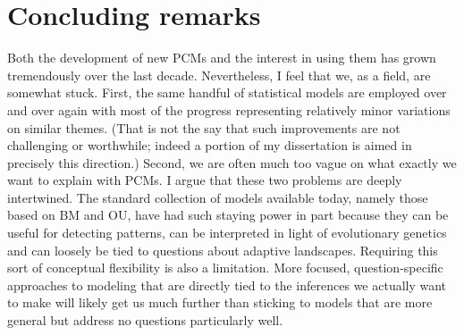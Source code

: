 \section{Concluding remarks}

Both the development of new PCMs and the interest in using them has grown tremendously over the last decade.  Nevertheless, I feel that we, as a field, are somewhat stuck. First, the same handful of statistical models are employed over and over again with most of the progress representing relatively minor variations on similar themes. (That is not the say that such improvements are not challenging or worthwhile; indeed a portion of my dissertation is aimed in precisely this direction.) Second, we are often much too vague on what exactly we want to explain with PCMs. I argue that these two problems are deeply intertwined. The standard collection of models available today, namely those based on BM and OU, have had such staying power in part because they can be useful for detecting patterns, can be interpreted in light of evolutionary genetics and can loosely be tied to questions about adaptive landscapes. Requiring this sort of conceptual flexibility is also a limitation. More focused, question-specific approaches to modeling that are directly tied to the inferences we actually want to make will likely get us much further than sticking to models that are more general but address no questions particularly well.

 

   

